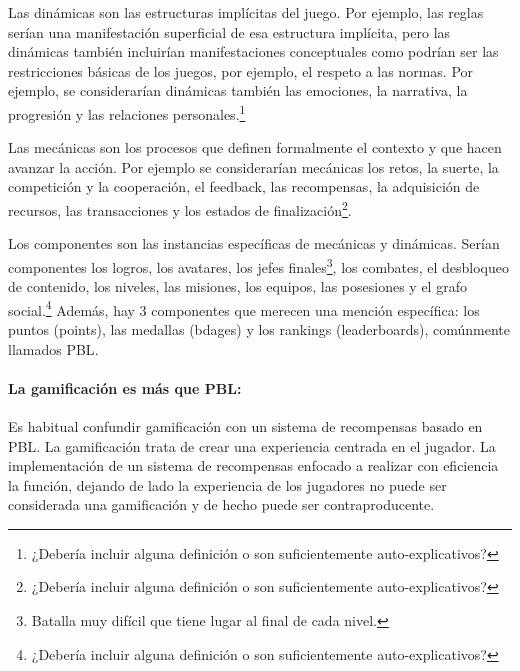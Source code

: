 %
Las dinámicas son las estructuras implícitas del juego. 
%
Por ejemplo, las reglas serían una manifestación superficial de esa estructura implícita, pero las dinámicas también incluirían manifestaciones conceptuales como podrían ser las restricciones básicas de los juegos, por ejemplo, el respeto a las normas.
%
Por ejemplo, se considerarían dinámicas también las emociones, la narrativa, la progresión y las relaciones personales.\footnote{¿Debería incluir alguna definición o son suficientemente auto-explicativos?}

 Las mecánicas son los procesos que definen formalmente el contexto y que hacen avanzar la acción. 
%
Por ejemplo se considerarían mecánicas los retos, la suerte, la competición y la cooperación, el feedback, las recompensas, la adquisición de recursos, las transacciones y los estados de finalización\footnote{¿Debería incluir alguna definición o son suficientemente auto-explicativos?}.

 Los componentes son las instancias específicas de mecánicas y dinámicas. 
%
Serían componentes los logros, los avatares, los jefes finales\footnote{Batalla muy difícil que tiene lugar al final de cada nivel.}, los combates, el desbloqueo de contenido, los niveles, las misiones, los equipos, las posesiones y el grafo social.\footnote{¿Debería incluir alguna definición o son suficientemente auto-explicativos?}
%
Además, hay 3 componentes que merecen una mención específica: los puntos (points), las medallas (bdages) y los rankings (leaderboards), comúnmente llamados \gls{PBL}.


\paragraph{La gamificación es más que \gls{PBL}:} Es habitual confundir gamificación con un sistema de recompensas basado en \gls{PBL}. 
%
La gamificación trata de crear una experiencia centrada en el jugador. 
%
La implementación de un sistema de recompensas enfocado a realizar con eficiencia la función, dejando de lado la experiencia de los jugadores no puede ser considerada una gamificación y de hecho puede ser contraproducente.

